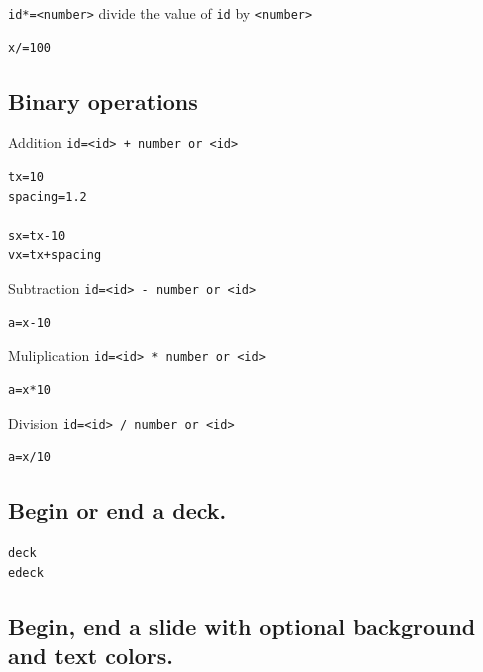 \texttt{id*=\textless{}number\textgreater{}} divide the value of
\texttt{id} by \texttt{\textless{}number\textgreater{}}

\begin{verbatim}
x/=100
\end{verbatim}

\hypertarget{binary-operations}{%
\subsection{Binary operations}\label{binary-operations}}

Addition
\texttt{id=\textless{}id\textgreater{}\ +\ number\ or\ \textless{}id\textgreater{}}

\begin{verbatim}
tx=10
spacing=1.2

sx=tx-10
vx=tx+spacing
\end{verbatim}

Subtraction
\texttt{id=\textless{}id\textgreater{}\ -\ number\ or\ \textless{}id\textgreater{}}

\begin{verbatim}
a=x-10
\end{verbatim}

Muliplication
\texttt{id=\textless{}id\textgreater{}\ *\ number\ or\ \textless{}id\textgreater{}}

\begin{verbatim}
a=x*10
\end{verbatim}

Division
\texttt{id=\textless{}id\textgreater{}\ /\ number\ or\ \textless{}id\textgreater{}}

\begin{verbatim}
a=x/10
\end{verbatim}

\hypertarget{begin-or-end-a-deck.}{%
\subsection{Begin or end a deck.}\label{begin-or-end-a-deck.}}

\begin{verbatim}
deck
edeck
\end{verbatim}

\hypertarget{begin-end-a-slide-with-optional-background-and-text-colors.}{%
\subsection{Begin, end a slide with optional background and text
colors.}\label{begin-end-a-slide-with-optional-background-and-text-colors.}}

